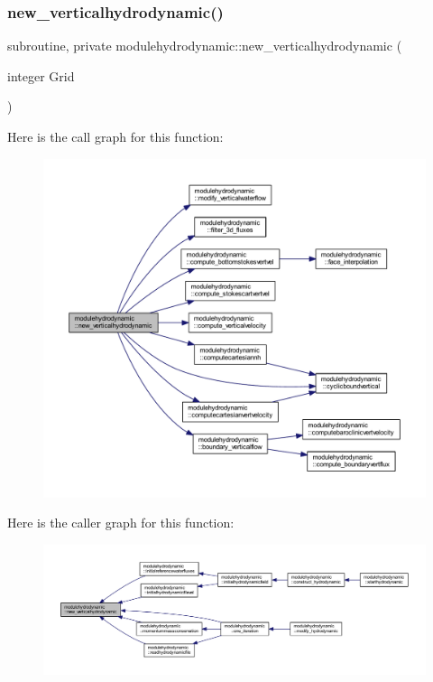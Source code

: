 \subsubsection{\texorpdfstring{new\+\_\+verticalhydrodynamic()}{new\_verticalhydrodynamic()}}
{\footnotesize\ttfamily subroutine, private modulehydrodynamic\+::new\+\_\+verticalhydrodynamic (\begin{DoxyParamCaption}\item[{integer}]{Grid }\end{DoxyParamCaption})\hspace{0.3cm}{\ttfamily [private]}}

Here is the call graph for this function\+:\nopagebreak
\begin{figure}[H]
\begin{center}
\leavevmode
\includegraphics[width=350pt]{namespacemodulehydrodynamic_a9865dafdd7098ab67142ed4fe05d5548_cgraph}
\end{center}
\end{figure}
Here is the caller graph for this function\+:\nopagebreak
\begin{figure}[H]
\begin{center}
\leavevmode
\includegraphics[width=350pt]{namespacemodulehydrodynamic_a9865dafdd7098ab67142ed4fe05d5548_icgraph}
\end{center}
\end{figure}
\mbox{\label{namespacemodulehydrodynamic_a00b05bd1a14d5fd621b3b3ab3463568b}} 
